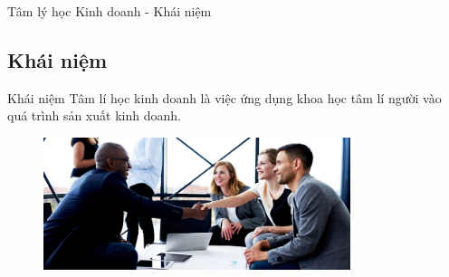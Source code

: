 \documentclass[../main.tex]{subfiles}
\begin{document}
\begin{frame}{Tâm lý học Kinh doanh - Khái niệm}

\subsection{Khái niệm}
\begin{block}{Khái niệm}
    Tâm lí học kinh doanh là việc ứng dụng khoa học tâm lí người vào quá trình sản xuất kinh doanh.
\end{block}
\begin{figure}
    \centering
    \includegraphics[width=0.8\textwidth]{anh/business-hand-shake.jpg}
\end{figure}

\end{frame}
\end{document}
